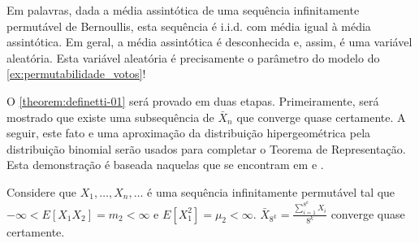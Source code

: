 Em palavras, dada a média assintótica
de uma sequência infinitamente permutável de Bernoullis,
esta sequência é i.i.d. com média igual à
média assintótica.
Em geral, a média assintótica é desconhecida e, assim,
é uma variável aleatória.
Esta variável aleatória é precisamente o 
parâmetro do modelo do 
\cref{ex:permutabilidade_votos}!

O \cref{theorem:definetti-01} será provado em duas etapas.
Primeiramente, será mostrado que 
existe uma subsequência de
$\bar{X}_{n}$ que converge quase certamente.
A seguir, este fato e uma aproximação da
distribuição hipergeométrica pela 
distribuição binomial serão usados para 
completar o Teorema de Representação.
Esta demonstração é baseada naquelas que
se encontram em
\citet[pp.34-38]{Schervish2012} e \citet{Heath1976}.

\begin{theorem}
 \label{thm:exchangeable-lgn}
 Considere que $X_{1},\ldots,X_{n},\ldots$ 
 é uma sequência infinitamente permutável tal que
 $-\infty < E[X_{1}X_{2}] = m_{2} < \infty$ e
 $E[X_{1}^{2}] = \mu_{2} < \infty$. 
 $\bar{X}_{8^{k}} = \frac{\sum_{i=1}^{8^{k}}{X_i}}{8^{k}}$
 converge quase certamente.
\end{theorem}

